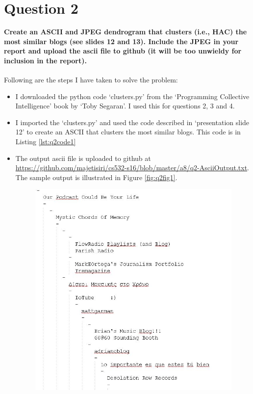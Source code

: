 \chapter{Question 2}
\label{avoiding-uri-aliases} 

\textbf {Create an ASCII and JPEG dendrogram that clusters (i.e., HAC) the most similar blogs (see slides 12 and 13). Include the JPEG in your report and upload the ascii file to github (it will be too unwieldy for inclusion in the report).}\\\\

Following are the steps I have taken to solve the problem:
\begin{itemize}
\item I downloaded the python code `clusters.py' from the `Programming Collective Intelligence' book by `Toby Segaran'. I used this for questions 2, 3 and 4. 
\item I imported the `clusters.py' and used the code described in `presentation slide 12' to create an ASCII that clusters the most similar blogs. This code is in Listing \ref{lst:q2code1} 
\newpage
\item The output ascii file is uploaded to github at \url{https://github.com/majetisiri/cs532-s16/blob/master/a8/q2-AsciiOutput.txt}. The sample output is illustrated in Figure \ref{fig:q2fig1}. 
\begin{figure}[h!]
\begin{center}
\hspace*{-3cm} 
\includegraphics[scale=0.55, keepaspectratio=true]{figures/2.JPG}

\end{center}
\end{figure}
\end{itemize}
